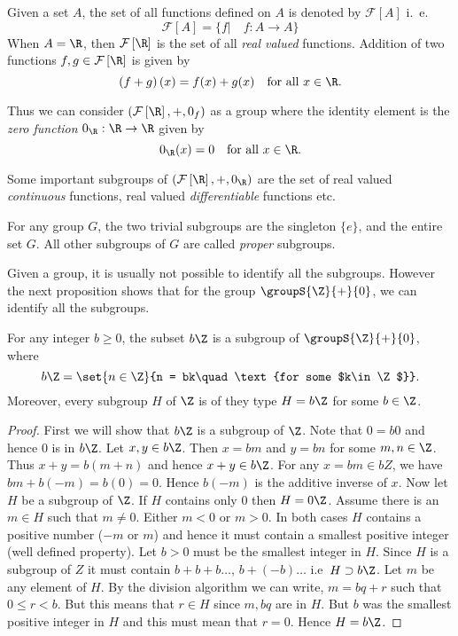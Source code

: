 Given a set $A$, the set of all functions defined on $A$ is denoted by $\mathcal{F}\left[A\right]$
i.~e.
\begin{equation*}
    \mathcal{F}\left[A\right] = \lbrace f | \quad f : A \to A \rbrace
\end{equation*}
When $A = \R$, then $\mathcal{F}\left[\R\right]$ is the set of all \emph{real valued} functions.
Addition of two functions $ f,g \in \mathcal{F}\left[\R\right]$ is given by 
\begin{equation*}
    \left(f + g\right)(x) = f(x) + g(x) \quad \text{for all $x \in \R$}.
\end{equation*}

Thus we can consider $\left(\mathcal{F}\left[\R\right],+,0_f\right)$ as a group where the identity
element is the \emph{zero function} $0_{\R} : \R \to \R$ given by
\begin{equation*}
    0_{\R}(x) = 0 \quad \text{for all $x \in \R$}.
\end{equation*}

Some important subgroups of $\left(\mathcal{F}\left[\R\right],+,0_{\R}\right)$  are the set of real
valued \emph{continuous} functions, real valued \emph{differentiable} functions etc.

For any group $G$, the two trivial subgroups are the singleton $\lbrace e \rbrace$, and the entire set $G$. 
All other subgroups of $G$ are called \emph{proper} subgroups. 

Given a group, it is usually not possible to identify all the subgroups. However the next proposition shows 
that for the group $\groupS{\Z}{+}{0}$, we can identify all the subgroups.
\begin{Proposition}\label{prop:subgroups_integers}
    For any integer $b \geq 0$, the subset $b\Z$ is a subgroup of $\groupS{\Z}{+}{0}$, where
    \[b\Z = \set{n\in\Z}{n = bk\quad\text{for some $k\in\Z$}}.\]
    Moreover, every subgroup $H$ of $\Z$ is of they type $H = b\Z$ for some $b \in \Z$.
\end{Proposition}
\begin{proof}
    First we will show that $b\Z$ is a subgroup of $\Z$. Note that $0 = b 0$ and hence $0$ is in $b\Z$.
    Let $x,y \in b\Z$. Then $x = bm$ and $y = bn$ for some $m,n \in \Z$. Thus $x + y = b(m+n)$ and hence $x+y
    \in b\Z$. For any $x = bm \in bZ$, we have $bm + b(-m) = b(0) = 0$. Hence $b(-m)$ is the additive inverse
    of $x$. Now let $H$ be a subgroup of $\Z$. If $H$ contains only $0$ then $H = 0\Z$. Assume there is an $m
    \in H$ such that $m \neq 0$. Either $m < 0$ or $ m > 0$. In both cases $H$ contains a positive number
    ($-m$ or $m$) and hence it must contain a smallest positive integer (well defined property). Let $b > 0$
    must be the smallest integer in $H$. Since $H$ is a subgroup of $Z$ it must contain $b+b+b \ldots$, $b +
    (-b) \ldots$ i.e~$H \supset b\Z$. Let $m$ be any element of $H$. By the division algorithm we can
    write, $m = bq + r$ such that $0\leq r < b$. But this means that $r \in H$ since $m,bq$ are in $H$. But
    $b$ was the smallest positive integer in $H$ and this must mean that $r = 0$. Hence $H = b\Z$.
\end{proof}

